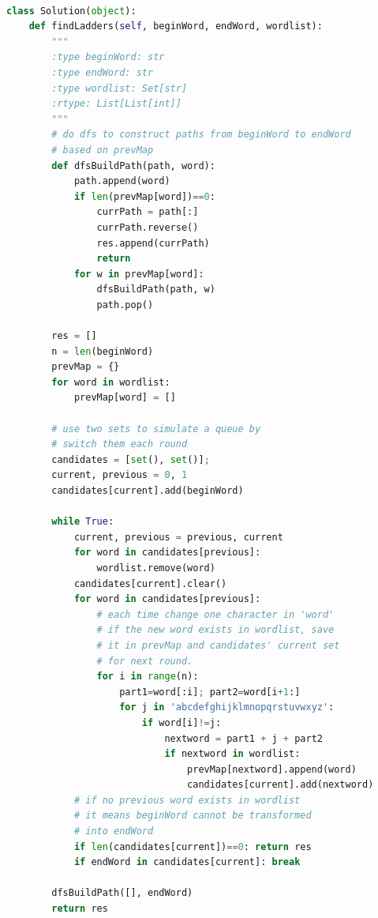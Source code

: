 \documentclass[a4paper,10pt]{article}
\begin{document}
\begin{lstlisting}[language=Python, caption=Problem126. Word Ladder II]

class Solution(object):
    def findLadders(self, beginWord, endWord, wordlist):
        """
        :type beginWord: str
        :type endWord: str
        :type wordlist: Set[str]
        :rtype: List[List[int]]
        """
        # do dfs to construct paths from beginWord to endWord
        # based on prevMap
        def dfsBuildPath(path, word):
            path.append(word)
            if len(prevMap[word])==0:
                currPath = path[:]
                currPath.reverse()
                res.append(currPath)
                return
            for w in prevMap[word]:
                dfsBuildPath(path, w)
                path.pop()

        res = []
        n = len(beginWord)
        prevMap = {}
        for word in wordlist:
            prevMap[word] = []
        
        # use two sets to simulate a queue by
        # switch them each round
        candidates = [set(), set()];
        current, previous = 0, 1
        candidates[current].add(beginWord)
        
        while True:
            current, previous = previous, current
            for word in candidates[previous]:
                wordlist.remove(word)
            candidates[current].clear()
            for word in candidates[previous]:
                # each time change one character in 'word'
                # if the new word exists in wordlist, save
                # it in prevMap and candidates' current set
                # for next round.
                for i in range(n):
                    part1=word[:i]; part2=word[i+1:]
                    for j in 'abcdefghijklmnopqrstuvwxyz':
                        if word[i]!=j:
                            nextword = part1 + j + part2
                            if nextword in wordlist:
                                prevMap[nextword].append(word)
                                candidates[current].add(nextword)
            # if no previous word exists in wordlist
            # it means beginWord cannot be transformed
            # into endWord
            if len(candidates[current])==0: return res
            if endWord in candidates[current]: break
        
        dfsBuildPath([], endWord)
        return res
\end{lstlisting}
\end{document}
